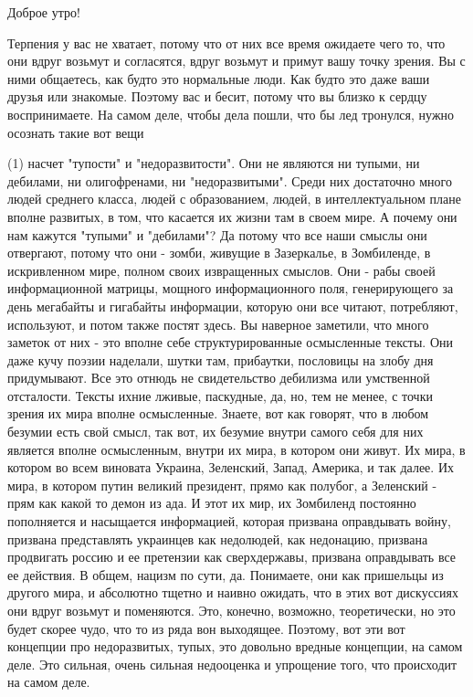  
 
 
 
 



Доброе утро!

Терпения у вас не хватает, потому что от них все время ожидаете чего то, что
они вдруг возьмут и согласятся, вдруг возьмут и примут вашу точку зрения. Вы с
ними общаетесь, как будто это нормальные люди. Как будто это даже ваши друзья
или знакомые. Поэтому вас и бесит, потому что вы близко к сердцу воспринимаете.
На самом деле, чтобы дела пошли, что бы лед тронулся, нужно осознать такие вот
вещи

(1) насчет "тупости" и "недоразвитости". Они не являются ни тупыми, ни
дебилами, ни олигофренами, ни "недоразвитыми". Среди них достаточно много людей
среднего класса, людей с образованием, людей, в интеллектуальном плане вполне
развитых, в том, что касается их жизни там в своем мире. А почему они нам
кажутся "тупыми" и "дебилами"? Да потому что все наши смыслы они отвергают,
потому что они - зомби, живущие в Зазеркалье, в Зомбиленде, в искривленном
мире, полном своих извращенных смыслов. Они - рабы своей информационной
матрицы, мощного информационного поля, генерирующего за день мегабайты и
гигабайты информации, которую они все читают, потребляют, используют, и потом
также постят здесь. Вы наверное заметили, что много заметок от них - это вполне
себе структурированные осмысленные тексты. Они даже кучу поэзии наделали, шутки
там, прибаутки, пословицы на злобу дня придумывают. Все это отнюдь не
свидетельство дебилизма или умственной отсталости. Тексты ихние лживые,
паскудные, да, но, тем не менее, с точки зрения их мира вполне осмысленные.
Знаете, вот как говорят, что в любом безумии есть свой смысл, так вот, их
безумие внутри самого себя для них является вполне осмысленным, внутри их мира,
в котором они живут. Их мира, в котором во всем виновата Украина, Зеленский,
Запад, Америка, и так далее. Их мира, в котором путин великий президент, прямо
как полубог, а Зеленский - прям как какой то демон из ада.  И этот их мир, их
Зомбиленд постоянно пополняется и насыщается информацией, которая призвана
оправдывать войну, призвана представлять украинцев как недолюдей, как
недонацию, призвана продвигать россию и ее претензии как сверхдержавы, призвана
оправдывать все ее действия. В общем, нацизм по сути, да. Понимаете, они как
пришельцы из другого мира, и абсолютно тщетно и наивно ожидать, что в этих вот
дискуссиях они вдруг возьмут и поменяются. Это, конечно, возможно,
теоретически, но это будет скорее чудо, что то из ряда вон выходящее.  Поэтому,
вот эти вот концепции про недоразвитых, тупых, это довольно вредные концепции,
на самом деле. Это сильная, очень сильная недооценка и упрощение того, что
происходит на самом деле.

